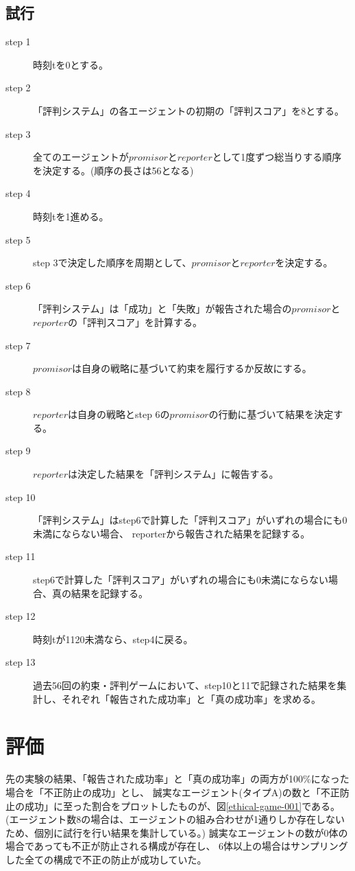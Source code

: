 \subsection{試行}
\begin{description}
  \item[step 1] 時刻tを0とする。
  \item[step 2] 「評判システム」の各エージェントの初期の「評判スコア」を8とする。
  \item[step 3] 全てのエージェントが$promisor$と$reporter$として1度ずつ総当りする順序を決定する。(順序の長さは56となる)
  \item[step 4] 時刻tを1進める。
  \item[step 5] step 3で決定した順序を周期として、$promisor$と$reporter$を決定する。
  \item[step 6] 「評判システム」は「成功」と「失敗」が報告された場合の$promisor$と$reporter$の「評判スコア」を計算する。
  \item[step 7] $promisor$は自身の戦略に基づいて約束を履行するか反故にする。
  \item[step 8] $reporter$は自身の戦略とstep 6の$promisor$の行動に基づいて結果を決定する。
  \item[step 9] $reporter$は決定した結果を「評判システム」に報告する。 
  \item[step 10] 「評判システム」はstep6で計算した「評判スコア」がいずれの場合にも0未満にならない場合、 reporterから報告された結果を記録する。
  \item[step 11] step6で計算した「評判スコア」がいずれの場合にも0未満にならない場合、真の結果を記録する。
  \item[step 12] 時刻tが1120未満なら、step4に戻る。
  \item[step 13] 過去56回の約束・評判ゲームにおいて、step10と11で記録された結果を集計し、それぞれ「報告された成功率」と「真の成功率」を求める。
\end{description}

\section{評価}
先の実験の結果、「報告された成功率」と「真の成功率」の両方が100\%になった場合を「不正防止の成功」とし、
誠実なエージェント(タイプA)の数と「不正防止の成功」に至った割合をプロットしたものが、図\ref{ethical-game-001}である。
(エージェント数8の場合は、エージェントの組み合わせが1通りしか存在しないため、個別に試行を行い結果を集計している。)
誠実なエージェントの数が0体の場合であっても不正が防止される構成が存在し、
6体以上の場合はサンプリングした全ての構成で不正の防止が成功していた。

